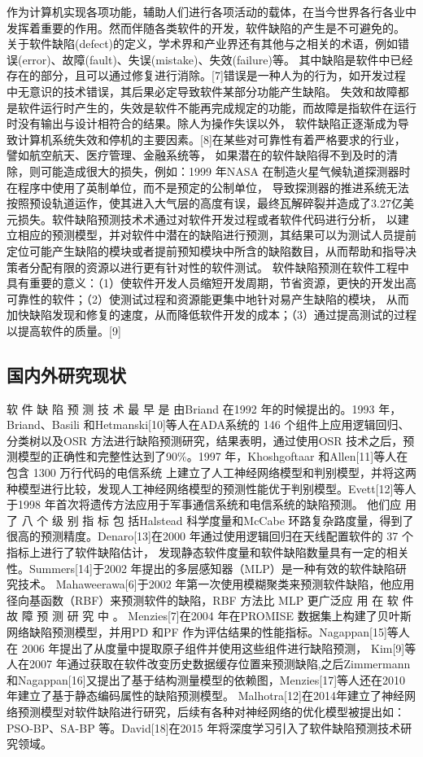 \documentclass[12pt, a4paper]{article}
\begin{document}
作为计算机实现各项功能，辅助人们进行各项活动的载体，在当今世界各行各业中发挥着重要的作用。然而伴随各类软件的开发，软件缺陷的产生是不可避免的。
关于软件缺陷(defect)的定义，学术界和产业界还有其他与之相关的术语，例如错误(error)、故障(fault)、失误(mistake)、失效(failure)等。
其中缺陷是软件中已经存在的部分，且可以通过修复进行消除。[7]错误是一种人为的行为，如开发过程中无意识的技术错误，其后果必定导致软件某部分功能产生缺陷。
失效和故障都是软件运行时产生的，失效是软件不能再完成规定的功能，而故障是指软件在运行时没有输出与设计相符合的结果。除人为操作失误以外，
软件缺陷正逐渐成为导致计算机系统失效和停机的主要因素。[8]在某些对可靠性有着严格要求的行业，譬如航空航天、医疗管理、金融系统等，
如果潜在的软件缺陷得不到及时的清除，则可能造成很大的损失，例如：1999 年NASA 在制造火星气候轨道探测器时在程序中使用了英制单位，而不是预定的公制单位，
导致探测器的推进系统无法按照预设轨道运作，使其进入大气层的高度有误，最终瓦解碎裂并造成了3.27亿美元损失。软件缺陷预测技术术通过对软件开发过程或者软件代码进行分析，
以建立相应的预测模型，并对软件中潜在的缺陷进行预测，其结果可以为测试人员提前定位可能产生缺陷的模块或者提前预知模块中所含的缺陷数目，从而帮助和指导决策者分配有限的资源以进行更有针对性的软件测试。
软件缺陷预测在软件工程中具有重要的意义：（1）使软件开发人员缩短开发周期，节省资源，更快的开发出高可靠性的软件；（2）使测试过程和资源能更集中地针对易产生缺陷的模块，
从而加快缺陷发现和修复的速度，从而降低软件开发的成本；（3）通过提高测试的过程以提高软件的质量。[9]

\subsection{国内外研究现状}

软 件 缺 陷 预 测 技 术 最 早 是 由Briand 在1992 年的时候提出的。1993 年，Briand、Basili 和Hetmanski[10]等人在ADA系统的 146 个组件上应用逻辑回归、
分类树以及OSR 方法进行缺陷预测研究，结果表明，通过使用OSR 技术之后，预测模型的正确性和完整性达到了90\%。1997 年，Khoshgoftaar 和Allen[11]等人在包含 1300 万行代码的电信系统
上建立了人工神经网络模型和判别模型，并将这两种模型进行比较，发现人工神经网络模型的预测性能优于判别模型。Evett[12]等人于1998 年首次将遗传方法应用于军事通信系统和电信系统的缺陷预测。
他们应 用 了 八 个 级 别 指 标 包 括Halstead 科学度量和McCabe 环路复杂路度量，得到了很高的预测精度。Denaro[13]在2000 年通过使用逻辑回归在天线配置软件的 37 个指标上进行了软件缺陷估计，
发现静态软件度量和软件缺陷数量具有一定的相关性。Summers[14]于2002 年提出的多层感知器（MLP）是一种有效的软件缺陷研究技术。
Mahaweerawa[6]于2002 年第一次使用模糊聚类来预测软件缺陷，他应用径向基函数（RBF）来预测软件的缺陷，RBF 方法比 MLP 更广泛应 用 在 软 件 故 障 预 测 研 究 中 。
Menzies[7]在2004 年在PROMISE 数据集上构建了贝叶斯网络缺陷预测模型，并用PD 和PF 作为评估结果的性能指标。Nagappan[15]等人在 2006 年提出了从度量中提取原子组件并使用这些组件进行缺陷预测，
Kim[9]等人在2007 年通过获取在软件改变历史数据缓存位置来预测缺陷,之后Zimmermann 和Nagappan[16]又提出了基于结构测量模型的依赖图，Menzies[17]等人还在2010 年建立了基于静态编码属性的缺陷预测模型。
Malhotra[12]在2014年建立了神经网络预测模型对软件缺陷进行研究，后续有各种对神经网络的优化模型被提出如：PSO-BP、SA-BP 等。David[18]在2015 年将深度学习引入了软件缺陷预测技术研究领域。
\end{document}
